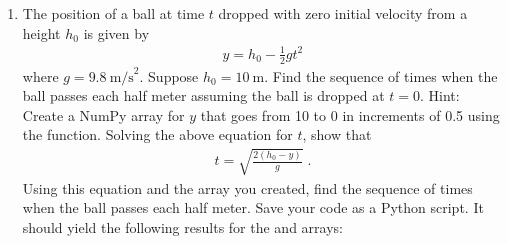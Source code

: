 \documentclass[letterpaper,10pt,english]{sphinxmanual}
\begin{document}
\begin{enumerate}
\item {} 
\sphinxAtStartPar
The position of a ball at time \(t\) dropped with zero initial velocity from a height \(h_0\) is given by
\begin{equation*}
\begin{split}y = h_0 - \tfrac{1}{2}gt^2\end{split}
\end{equation*}
\sphinxAtStartPar
where \(g=9.8~\mathrm{m/s}^2\).  Suppose \(h_0=10~\mathrm{m}\).  Find the sequence of times when the ball passes each half meter assuming the ball is dropped at \(t=0\).  Hint: Create a NumPy array for \(y\) that goes from 10 to 0 in increments of \sphinxhyphen{}0.5 using the  function.  Solving the above equation for \(t\), show that
\begin{equation*}
\begin{split}t = \sqrt{\frac{2(h_0-y)}{g}} \;.\end{split}
\end{equation*}
\sphinxAtStartPar
Using this equation and the array you created, find the sequence of times when the ball passes each half meter.  Save your code as a Python script.  It should yield the following results for the  and  arrays:

\begin{sphinxVerbatim}[commandchars=\\\{\},numbers=left,firstnumber=1,stepnumber=1]
\PYG{p}{[}           
\PYG{g+go}{                2. , 1.5, 1. , 0.5])}

\PYG{p}{[}           
\PYG{g+go}{                1.35526185, 1.39239919])}
\end{sphinxVerbatim}


\end{enumerate}
\end{document}

